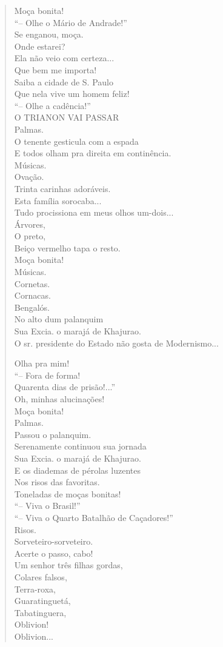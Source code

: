 \begin{verse}
Moça bonita!\\
``-- Olhe o Mário de Andrade!''\\
Se enganou, moça.\\
Onde estarei?\\
Ela não veio com certeza...\\
Que bem me importa!\\
Saiba a cidade de S. Paulo\\
Que nela vive um homem feliz!\\
``-- Olhe a cadência!''\\
O TRIANON VAI PASSAR\\
Palmas.\\
O tenente gesticula com a espada\\
E todos olham pra direita em continência.\\
Músicas.\\
Ovação.\\
Trinta carinhas adoráveis.\\
Esta família sorocaba...\\
Tudo procissiona em meus olhos um-dois...\\
Árvores,\\
O preto,\\
Beiço vermelho tapa o resto.\\
Moça bonita!\\
Músicas.\\
Cornetas.\\
Cornacas.\\
Bengalós.\\
No alto dum palanquim\\
Sua Excia. o marajá de Khajurao.\\
O sr. presidente do Estado não gosta de Modernismo...

Olha pra mim!\\
``-- Fora de forma!\\
Quarenta dias de prisão!...''\\
Oh, minhas alucinações!\\
Moça bonita!\\
Palmas.\\
Passou o palanquim.\\
Serenamente continuou sua jornada\\
Sua Excia. o marajá de Khajurao.\\
E os diademas de pérolas luzentes\\
Nos risos das favoritas.\\
Toneladas de moças bonitas!\\
``-- Viva o Brasil!''\\
``-- Viva o Quarto Batalhão de Caçadores!''\\
Risos.\\
Sorveteiro-sorveteiro.\\
Acerte o passo, cabo!\\
Um senhor três filhas gordas,\\
Colares falsos,\\
Terra-roxa,\\
Guaratinguetá,\\
Tabatinguera,\\
Oblivion!\\
Oblivion...


\end{verse}
